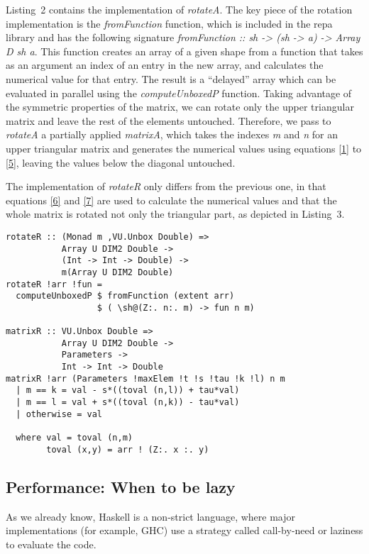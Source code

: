 \documentclass{tmr}
\begin{document}
Listing~2 contains the implementation of \textit{rotateA}.
%
The key piece of the rotation implementation is the
\textit{fromFunction} function, which is included in the repa library
and has the following signature 
\textit{fromFunction :: sh -> (sh -> a) -> Array D sh a}.
%
This function creates an array of a given shape from a function that
takes as an argument an index of an entry in the new array, and
calculates the numerical value for that entry.
%
The result is a ``delayed'' array which can be evaluated in parallel
using the \textit{computeUnboxedP} function.
%
Taking advantage of the symmetric properties of the matrix, we can
rotate only the upper triangular matrix and leave the rest of the elements untouched.
%
Therefore, we pass to \textit{rotateA} a partially applied
\textit{matrixA}, which takes the indexes \textit{m} and \textit{n} for
an upper triangular matrix and generates the numerical values using
equations \eqref{1} to \eqref{5}, leaving the values below the diagonal
untouched.

The implementation of \textit{rotateR} only differs from the previous
one, in that equations \eqref{6} and \eqref{7} are used to calculate the
numerical values and that the whole matrix is rotated not only the
triangular part, as depicted in Listing~3.

\begin{lstlisting}[float,captionpos=b,belowcaptionskip=4pt, caption= rotateR function]
rotateR :: (Monad m ,VU.Unbox Double) =>
           Array U DIM2 Double ->
           (Int -> Int -> Double) ->
           m(Array U DIM2 Double)
rotateR !arr !fun =
  computeUnboxedP $ fromFunction (extent arr)
                  $ ( \sh@(Z:. n:. m) -> fun n m)
        
matrixR :: VU.Unbox Double =>
           Array U DIM2 Double ->
           Parameters ->
           Int -> Int -> Double
matrixR !arr (Parameters !maxElem !t !s !tau !k !l) n m
  | m == k = val - s*((toval (n,l)) + tau*val)
  | m == l = val + s*((toval (n,k)) - tau*val)
  | otherwise = val

  where val = toval (n,m)
        toval (x,y) = arr ! (Z:. x :. y)
\end{lstlisting}

\subsection{Performance: When to be lazy}

As we already know, Haskell is a non-strict language, where major
implementations (for example, GHC) use a strategy called call-by-need or
laziness to evaluate the code.
\end{document}
